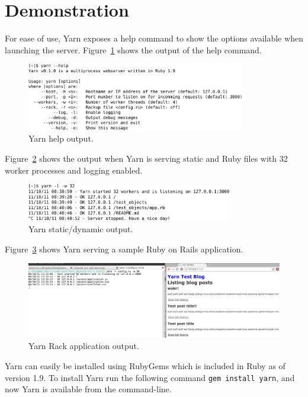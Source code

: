 \section{Demonstration}
For ease of use, Yarn exposes a help command to show the options available
when launching the server. Figure~\ref{screenshot} shows the output of the
help command.

\begin{figure}[htb]
  \centering
  \includegraphics[width=0.85\textwidth]{img/yarnhelp.pdf}
  \caption{Yarn help output.}
  \label{screenshot}
\end{figure}

Figure~\ref{screenshot2} shows the output when Yarn is serving static and Ruby
files with 32 worker processes and logging enabled.

\begin{figure}[htb]
  \centering
  \includegraphics[width=0.8\textwidth]{img/yarnserve.pdf}
  \caption{Yarn static/dynamic output.}
  \label{screenshot2}
\end{figure}

Figure~\ref{screenshot3} shows Yarn serving a sample Ruby on Rails
application.

\begin{figure}[htb]
  \centering
  \includegraphics[width=1.0\textwidth]{img/scr3.png}
  \caption{Yarn Rack application output.}
  \label{screenshot3}
\end{figure}

Yarn can easily be installed using RubyGems which is included in Ruby as of
version 1.9. To install Yarn run the following command \texttt{gem install
  yarn}, and now Yarn is available from the command-line. 

